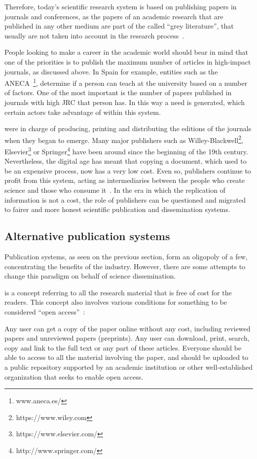 Therefore, today's scientific research system is based on publishing papers in
journals and conferences, as the papers of an academic research that are
published in any other medium are part of the called ``grey literature'', that
usually are not taken into account in the research
process~\cite{rothstein2009grey}.

People looking to make a career in the academic world should bear in mind that
one of the priorities is to publish the maximum number of articles in
high-impact journals, as discussed above. In Spain for example, entities such as
the ANECA~\footnote{www.aneca.es/}, determine if a person can teach at the
university based on a number of factors. One of the most important is the number
of papers published in journals with high JRC that person has. In this way a
need is generated, which certain actors take advantage of within this system.

 were in charge of producing, printing and distributing the
editions of the journals when they began to emerge. Many major publishers such
as Willey-Blackwell\footnote{https://www.wiley.com},
Elsevier\footnote{https://www.elsevier.com/} or
Springer\footnote{http://www.springer.com/} have been around since the beginning
of the 19th century. Nevertheless, the digital age has meant that copying a
document, which used to be an expensive process, now has a very low cost. Even
so, publishers continue to profit from this system, acting as intermediaries
between the people who create science and those who consume
it~\cite{lariviere2015oligopoly}. In the era in which the replication of
information is not a cost, the role of publishers can be questioned and migrated
to fairer and more honest scientific publication and dissemination systems.

\subsection{Alternative publication systems}
\label{soa:aps}
Publication systems, as seen on the previous section, form an oligopoly of a
few, concentrating the benefits of the industry. However, there are some
attempts to change this paradigm on behalf of science dissemination.

 is a concept referring to all the research material that is
free of cost for the readers. This concept also involves various conditions for
something to be considered ``open access''~\cite{bailey2007open}:

\begin{itemize}
   Any user can get a copy of the paper online
  without any cost, including reviewed papers and unreviewed papers (preprints).
   Any user can download, print, search, copy and link to
  the full text or any part of these articles.  Everyone
  should be able to access to all the material involving the paper, and should
  be uploaded to a public repository supported by an academic institution or
  other well-established organization that seeks to enable open access.
\end{itemize}

